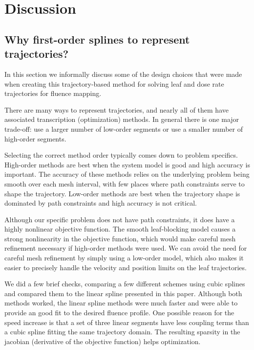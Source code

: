 \section{Discussion}

\subsection{Why first-order splines to represent trajectories?}
\label{sec:WhyUseLinearSplines}

In this section we informally discuss some of the design choices that were made when creating this
trajectory-based method for solving leaf and dose rate trajectories for fluence mapping.


There are many ways to represent trajectories, and nearly all of them have associated transcription (optimization) methods.
In general there is one major trade-off:
use a larger number of low-order segments or
use a smaller number of high-order segments.

Selecting the correct method order typically comes down to problem specifics.
High-order methods are best when the system model is good and high accuracy is important.
The accuracy of these methods relies on the underlying problem being smooth over each
mesh interval, with few places where path constraints serve to shape the trajectory.
Low-order methods are best when the trajectory shape is dominated by path constraints and
high accuracy is not critical.

Although our specific problem does not have path constraints, it does have a highly nonlinear objective function.
The smooth leaf-blocking model causes a strong nonlinearity in the objective function,
which would make careful mesh refinement necessary if high-order methods were used.
We can avoid the need for careful mesh refinement by simply using a low-order model,
which also makes it easier to precisely handle the velocity and position limits on the leaf trajectories.

We did a few brief checks, comparing a few different schemes using cubic splines and compared them
to the linear spline presented in this paper. Although both methods worked, the linear spline methods
were much faster and were able to provide an good fit to the desired fluence profile.
One possible reason for the speed increase is that a set of three linear segments have less
coupling terms than a cubic spline fitting the same trajectory domain. The resulting sparsity in the
jacobian (derivative of the objective function) helps optimization. \cite{Betts}

